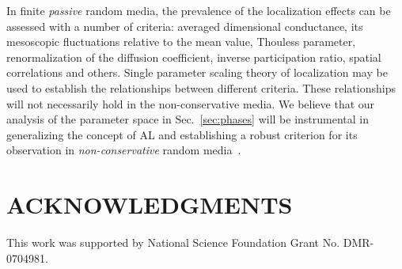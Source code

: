 In finite {\it passive} random media, the prevalence of the localization effects can be assessed with a number of criteria: averaged dimensional conductance, its mesoscopic fluctuations relative to the mean value, Thouless parameter, renormalization of the diffusion coefficient, inverse participation ratio, spatial correlations and others. Single parameter scaling theory of localization may be used to establish the relationships between different criteria. These relationships will not necessarily hold in the non-conservative media. We believe that our analysis of the parameter space in Sec.~\ref{sec:phases} will be instrumental in generalizing the concept of AL and establishing a robust criterion for its observation in {\it non-conservative} random media~\cite{2010_Payne_loc_criterion,2010_Payne_TE}.

\section{ACKNOWLEDGMENTS}
This work was supported by National Science Foundation Grant No. DMR-0704981. 

% 
% 

%
